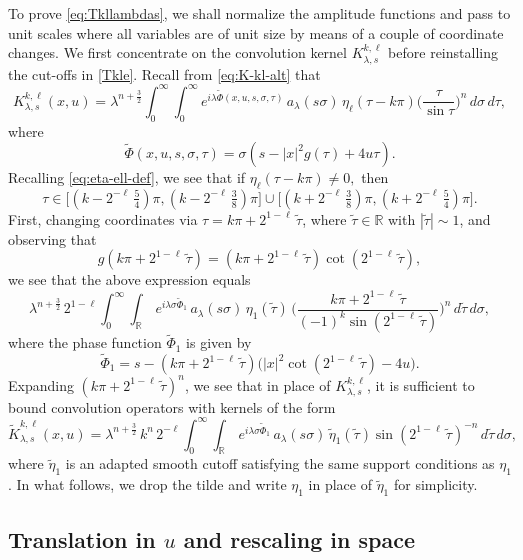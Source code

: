 \documentclass[leqno]{amsart}
\theoremstyle{definition}
\theoremstyle{remark}
\numberwithin{equation}{section}
\newcommand{\R}{\mathbb{R}}
\begin{document}
To prove \eqref{eq:Tkllambdas}, we shall normalize the amplitude functions and pass to  unit scales where all variables are of unit size by means of a couple of coordinate changes. We first concentrate on the convolution kernel $K_{\lambda,s}^{k,\ell}$ before reinstalling the cut-offs in \eqref{Tkle}.
Recall from \eqref{eq:K-kl-alt} that
\[
K_{\lambda,s}^{k,\ell}(x, u) = \lambda^{n + \frac 32} \int_0^\infty \int_0^\infty e^{i\lambda\tilde \Phi(x,u,s,\sigma,\tau)} \, a_\lambda(s\sigma) \, \eta_\ell(\tau -k \pi)\Big(\frac{\tau}{\sin\tau}\Big)^n \, d\sigma \, d\tau,
\]
where
\[
\tilde \Phi(x,u,s,\sigma,\tau) = \sigma(s-|x|^2 g(\tau) + 4u\tau).
\]
Recalling \eqref{eq:eta-ell-def}, we see that if $\eta_\ell(\tau -k \pi)\neq 0,$ then
\begin{equation}\label{supptau}
\tau\in \big[(k-2^{-\ell}\, \tfrac 54)\pi,(k-2^{-\ell}\,\tfrac 38)\pi] \cup [(k+2^{-\ell}\, \tfrac 38)\pi,(k+2^{-\ell}\,\tfrac 54)\pi\big].
\end{equation}
First, changing coordinates via $\tau = k\pi + 2^{1-\ell} \, \tilde \tau$, where $\tilde \tau\in\R$ with $|\tilde \tau|\sim 1$, and observing that
\[
g(k\pi + 2^{1-\ell} \, \tilde \tau) = (k\pi + 2^{1-\ell} \, \tilde \tau)\cot( 2^{1-\ell} \, \tilde \tau),
\]
we see that the above expression equals
\[
\lambda^{n + \frac 32} \, 2^{1-\ell}\int_0^\infty \int_\R \, e^{i \lambda \sigma \tilde \Phi_1} \, a_\lambda(s\sigma) \, \eta_1(\tilde \tau) \, \Big(\frac{k\pi + 2^{1-\ell} \, \tilde \tau}{(-1)^k \sin (2^{1-\ell} \, \tilde \tau)}\Big)^{n} 
 \, d\tilde \tau \, d\sigma,
\]
where the phase function  $\tilde \Phi_1$ is given by
\[
\tilde \Phi_1 = s-\left(k\pi + 2^{1-\ell} \, \tilde \tau\right) \big( |x|^2 \cot( 2^{1-\ell} \, \tilde \tau) - 4 u\big).
\]
Expanding $(k\pi + 2^{1-\ell} \, \tilde \tau)^{n}$, we see that in place of $K_{\lambda,s}^{k,\ell}$, it is sufficient to bound convolution operators with kernels of the form
\begin{equation}\label{eq:kl-tilde}
\tilde K_{\lambda,s}^{k,\ell}(x,u)=\lambda^{n + \frac 32} \, k^{n} \, 2^{-\ell}\int_0^\infty \int_\R \, e^{i \lambda \sigma\tilde \Phi_1} \, a_\lambda(s\sigma) \, \tilde \eta_1(\tilde \tau)   \sin (2^{1-\ell} \, \tilde \tau)^{-n} \, d \tilde \tau \, d\sigma,
\end{equation}
where $\tilde\eta_1$ is an adapted smooth cutoff satisfying the same support conditions as $\eta_1$. In what follows, we drop the tilde and write $\eta_1$ in place of $\tilde\eta_1$ for simplicity.


\subsection{Translation in $u$ and rescaling in space}
\end{document}
